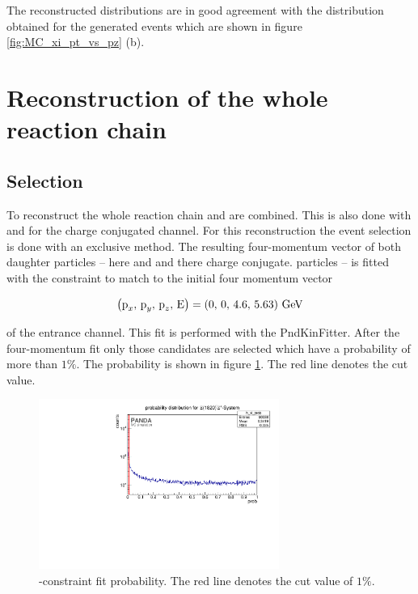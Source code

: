 	The reconstructed distributions are in good agreement with the distribution obtained for the generated events which are 
	shown in figure \ref{fig:MC_xi_pt_vs_pz} (b).
	
	
	
	
\section{Reconstruction of the whole reaction chain}

	\subsection*{Selection}
	
	To reconstruct the whole reaction chain \excitedcascade and \anticascade are combined.
	This is also done with \excitedanticascade and \cascade for the charge conjugated channel.
	For this reconstruction the event selection is done with an exclusive method.
	The resulting four-momentum vector of both daughter particles --  here \excitedcascade 
	and \anticascade and there charge conjugate. particles -- is fitted with the constraint to match to the initial four momentum vector  

	\begin{center}
		\begin{equation}\nonumber
			\left(\textnormal{p}_x,\, \textnormal{p}_y,\, \textnormal{p}_z,\, \textnormal{E} \right) = \left(0,\, 0,\, 4.6,\, 5.63 \right) \, \textnormal{GeV}
		\end{equation}
	\end{center}
	of the \pbarpSystem entrance channel.	
	This fit is performed with the PndKinFitter.
	After the four-momentum fit only those candidates are selected which have a probability of more than $1\%$.
	The probability is shown in figure \ref{fig:xisys_prob}. 
	The red line denotes the cut value.

	\begin{figure}
		\centering
		\includegraphics[width=0.7\textwidth]{./plots/pbarp/XiSys_prob.pdf}
		\caption{-constraint fit probability. The red line denotes the cut value of $1\%$.}
		\label{fig:xisys_prob}
	\end{figure}
	
